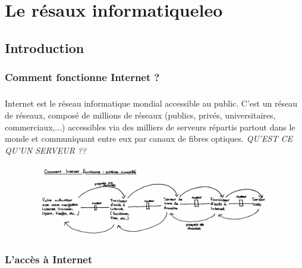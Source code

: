 \documentclass[12pt, oneside]{report}
\begin{document}
\chapter{Le résaux informatiqueleo}
    \section{Introduction}
        \subsection{Comment fonctionne Internet ?}
        \paragraph{}{Internet est le réseau informatique mondial accessible au public. C'est un réseau de réseaux, composé de millions de réseaux (publics, privés, universitaires, commerciaux,...) accessibles via des milliers de serveurs répartis partout dans le monde et communiquant entre eux par canaux de fibres optiques. }
        \textit{QU'EST CE QU'UN SERVEUR ??}
        
        \begin{figure}[h]
        \includegraphics[scale = 0.18]{img_template/comment-internet-fonctionne.jpg}
        \centering
        \label{Fctn Internet}
        \end{figure}        
        
        \subsection{L'accès à Internet}
\end{document}
